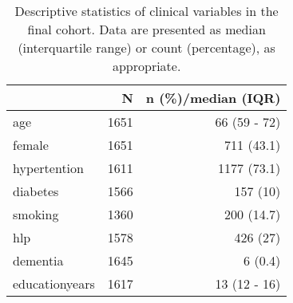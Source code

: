\begin{table}

\caption{Descriptive statistics of clinical variables in the final cohort. Data are presented as median (interquartile range) or count (percentage), as appropriate.}
\centering
\begin{tabular}[t]{l|r|r}
\hline
 & N & n (\%)/median (IQR)\\
\hline
age & 1651 & 66 (59 - 72)\\
\hline
female & 1651 & 711 (43.1)\\
\hline
hypertention & 1611 & 1177 (73.1)\\
\hline
diabetes & 1566 & 157 (10)\\
\hline
smoking & 1360 & 200 (14.7)\\
\hline
hlp & 1578 & 426 (27)\\
\hline
dementia & 1645 & 6 (0.4)\\
\hline
educationyears & 1617 & 13 (12 - 16)\\
\hline
\end{tabular}
\end{table}
